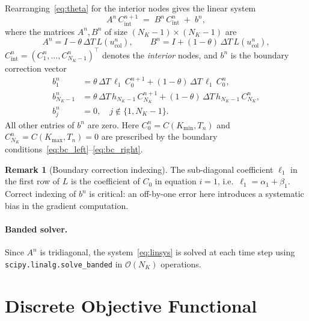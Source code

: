 \documentclass[11pt, a4paper]{article}
\newcommand{\dT}{\Delta T}
\theoremstyle{definition}
\newtheorem{remark}{Remark}[section]
\theoremstyle{plain}
\begin{document}
\noindent
Rearranging~\eqref{eq:theta} for the interior nodes gives the linear system
\begin{equation}\label{eq:linsys}
  A^n\,C_\text{int}^{n+1} \;=\; B^n\,C_\text{int}^n \;+\; b^n,
\end{equation}
where the matrices $A^n, B^n$ of size $(N_K-1)\times(N_K-1)$ are
\begin{equation}\label{eq:AB}
  A^n = I - \theta\,\dT\,L(u_\text{col}^n),
  \qquad
  B^n = I + (1-\theta)\,\dT\,L(u_\text{col}^n),
\end{equation}
$C_\text{int}^n = (C_1^n, \ldots, C_{N_K-1}^n)^\top$ denotes the
\emph{interior} nodes, and $b^n$ is the boundary correction vector
\begin{equation}\label{eq:bcorrect}
\begin{split}
  b^n_1 &= \theta\,\dT\,\ell_1\,C_0^{n+1}
          + (1-\theta)\,\dT\,\ell_1\,C_0^n, \\
  b^n_{N_K-1} &= \theta\,\dT\,h_{N_K-1}\,C_{N_K}^{n+1}
               + (1-\theta)\,\dT\,h_{N_K-1}\,C_{N_K}^n, \\
  b^n_j &= 0, \quad j \notin \{1, N_K-1\}.
\end{split}
\end{equation}
All other entries of $b^n$ are zero. Here $C_0^n = C(K_{\min}, T_n)$ and
$C_{N_K}^n = C(K_{\max}, T_n) = 0$ are prescribed by the boundary
conditions~\eqref{eq:bc_left}--\eqref{eq:bc_right}.

\begin{remark}[Boundary correction indexing]
The sub-diagonal coefficient $\ell_1$ in the first row of $L$ is the
coefficient of $C_0$ in equation $i=1$, i.e.\ $\ell_1 = \alpha_1 + \beta_1$.
Correct indexing of $b^n$ is critical: an off-by-one error here introduces
a systematic bias in the gradient computation.
\end{remark}

\paragraph{Banded solver.}
Since $A^n$ is tridiagonal, the system~\eqref{eq:linsys} is solved at
each time step using \texttt{scipy.linalg.solve\_banded} in $\mathcal{O}(N_K)$
operations.

\section{Discrete Objective Functional}
\end{document}
